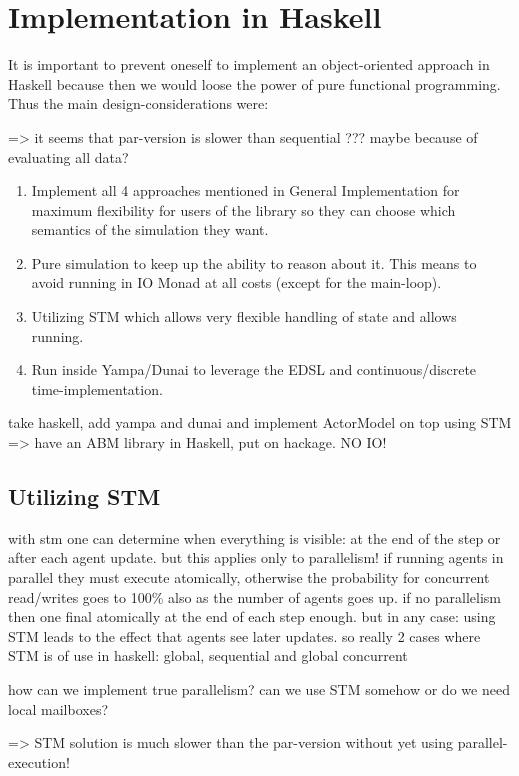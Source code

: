 \section{Implementation in Haskell}
It is important to prevent oneself to implement an object-oriented approach in Haskell because then we would loose the power of pure functional programming. Thus the main design-considerations were:

=> it seems that par-version is slower than sequential ??? maybe because of evaluating all data?

\begin{enumerate}
\item Implement all 4 approaches mentioned in General Implementation for maximum flexibility for users of the library so they can choose which semantics of the simulation they want.
\item Pure simulation to keep up the ability to reason about it. This means to avoid running in IO Monad at all costs (except for the main-loop).
\item Utilizing STM which allows very flexible handling of state and allows running.
\item Run inside Yampa/Dunai to leverage the EDSL and continuous/discrete time-implementation.
\end{enumerate}

take haskell, add yampa and dunai and implement ActorModel on top using STM => have an ABM library in Haskell, put on hackage. NO IO!

\subsection{Utilizing STM}
with stm one can determine when everything is visible: at the end of the step or after each agent update. but this applies only to parallelism! if running agents in parallel they must execute atomically, otherwise the probability for concurrent read/writes goes to 100\% also as the number of agents goes up. if no parallelism then one final atomically at the end of each step enough. but in any case: using STM leads to the effect that agents see later updates. so really 2 cases where STM is of use in haskell: global, sequential and global concurrent

how can we implement true parallelism? can we use STM somehow or do we need local mailboxes?

=> STM solution is much slower than the par-version without yet using parallel-execution!

